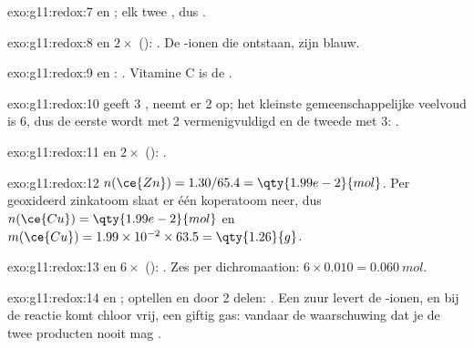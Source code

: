\begin{solution}{exo:g11:redox:7}
 en ; elk twee
, dus .
\end{solution}

\begin{solution}{exo:g11:redox:8}
 en $2\times$ ():
. De -ionen die ontstaan, zijn
blauw.
\end{solution}

\begin{solution}{exo:g11:redox:9}
 en :
. Vitamine C is de .
\end{solution}

\begin{solution}{exo:g11:redox:10}
 geeft 3 , 
neemt er 2 op; het kleinste gemeenschappelijke veelvoud is 6, dus de
eerste wordt met 2 vermenigvuldigd en de tweede met 3:
.
\end{solution}

\begin{solution}{exo:g11:redox:11}
 en $2\times$ ():
.
\end{solution}

\begin{solution}{exo:g11:redox:12}
$n(\ce{Zn}) = 1.30/65.4 = \qty{1.99e-2}{mol}$. Per geoxideerd zinkatoom
slaat er één koperatoom neer, dus $n(\ce{Cu}) = \qty{1.99e-2}{mol}$
en $m(\ce{Cu}) = 1.99\times 10^{-2} \times 63.5 = \qty{1.26}{g}$.
\end{solution}

\begin{solution}{exo:g11:redox:13}
 en
$6\times$ ():
.
Zes  per dichromaation: $6 \times 0.010 = \qty{0.060}{mol}$.
\end{solution}

\begin{solution}{exo:g11:redox:14}
 en ; optellen
en door 2 delen: . Een zuur levert de
-ionen, en bij de reactie komt chloor vrij, een giftig gas:
vandaar de waarschuwing dat je de twee producten nooit mag .
\end{solution}

